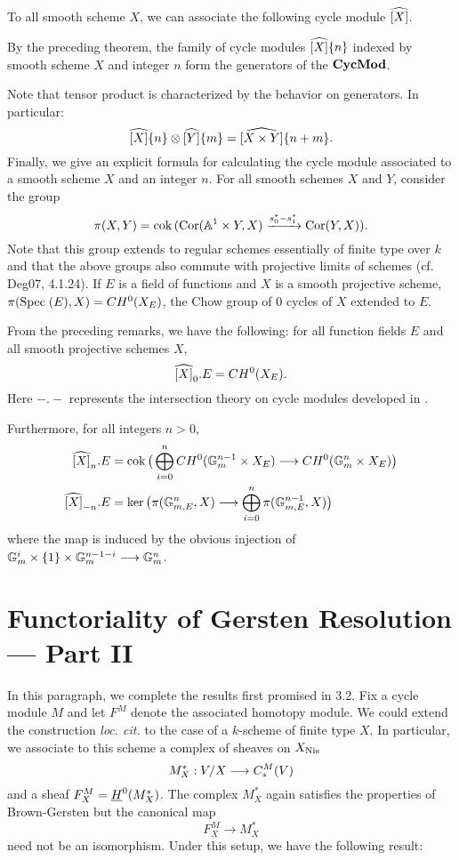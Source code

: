 To all smooth scheme $X$, we can associate the following cycle 
module $\widehat{[X]}$.

By the preceding theorem, the family of cycle modules 
$\widehat{[X]}\{n\}$ indexed by smooth scheme $X$ and integer 
$n$ form the generators of the $\mathbf{CycMod}$.

Note that tensor product is characterized by the behavior on 
generators. In particular:
\[
\widehat{[X]}\{n\} \otimes \widehat{[Y]}\{m\} =
\widehat{[X \times Y]}\{n + m\}.
\]
Finally, we give an explicit formula for calculating the cycle 
module associated to a smooth scheme $X$ and an integer $n$. 
For all smooth schemes $X$ and $Y$, consider the group
\[
\pi(X, Y) = \mathrm{cok}\, (\mathrm{Cor}(\mathbb{A}^1 \times Y, X) 
   \xrightarrow{s_0^* - s_1^*} \mathrm{Cor}(Y, X)).
\]
Note that this group extends to regular schemes essentially of 
finite type over $k$ and that the above groups also commute with
projective limits of schemes (cf. Deg07, 4.1.24). If $E$ is a 
field of functions and $X$ is a smooth projective scheme, 
$\pi(\mathrm{Spec}\;(E), X) = CH^0(X_E)$, the Chow group of 0 cycles of
$X$ extended to $E$.

From the preceding remarks, we have the following: for all 
function fields $E$ and all smooth projective schemes $X$,
\[
\widehat{[X]}_0 . E = CH^0(X_E).
\]
Here $- . -$ represents the intersection theory on cycle modules 
developed in \cite{Ro96}.

Furthermore, for all integers $n > 0$,
\begin{align*}
\widehat{[X]}_n . E &= \mathrm{cok}\,\big( \bigoplus_{i = 0}^n 
   CH^0(\mathbb{G}_m^{n - 1} \times X_E) \longrightarrow 
      CH^0(\mathbb{G}_m^n \times X_E)\big) \\
\widehat{[X]}_{-n} . E &= \mathrm{ker}\,\big(\pi(\mathbb{G}_{m,E}^n, X)
   \longrightarrow \bigoplus_{i = 0}^n \pi(\mathbb{G}_{m, E}^{n - 1}, X)\big)
\end{align*}
where the map is induced by the obvious injection of $\mathbb{G}_m^i 
\times \{1\} \times \mathbb{G}_m^{n - 1 - i} \longrightarrow \mathbb{G}_m^n$.

\section{Functoriality of Gersten Resolution --- Part II}

In this paragraph, we complete the results first promised in 3.2.
Fix a cycle module $M$ and let $F^M$ denote the associated 
homotopy module. We could extend the construction \emph{loc. cit.}
to the case of a $k$-scheme of finite type $X$. In particular, we 
associate to this scheme a complex of sheaves on $X_{\mathrm{Nis}}$
\[
M^*_X: V/X \longrightarrow C_*^{M}(V)
\]
and a sheaf $F^M_X = \underline{H}^0(M^*_X)$. The complex $M^*_X$ 
again satisfies the properties of Brown-Gersten but the canonical
map
\[
F^M_X \to M^*_X
\]
need not be an isomorphism. Under this setup, we have the 
following result:
